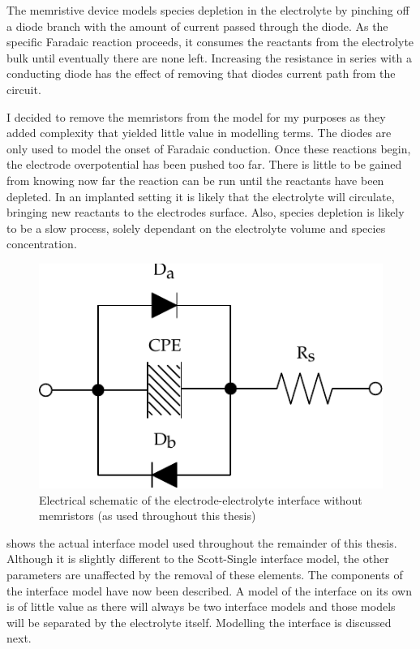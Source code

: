       The memristive device models species depletion in the electrolyte by pinching off a diode branch with the amount of current passed through the diode.
      As the specific Faradaic reaction proceeds, it consumes the reactants from the electrolyte bulk until eventually there are none left.
      Increasing the resistance in series with a conducting diode has the effect of removing that diodes current path from the circuit.

      I decided to remove the memristors from the model for my purposes as they added complexity that yielded little value in modelling terms.
      The diodes are only used to model the onset of Faradaic conduction.
      Once these reactions begin, the electrode overpotential has been pushed too far.
      There is little to be gained from knowing now far the reaction can be run until the reactants have been depleted.
      In an implanted setting it is likely that the electrolyte will circulate, bringing new reactants to the electrodes surface.
      Also, species depletion is likely to be a slow process, solely dependant on the electrolyte volume and species concentration.

      \begin{figure}
        \centering
        \includegraphics{content/pt2/07-InterfaceModel/graphics/interfaceSchematic_noMemristive}
        \caption{\label{fig:pt2-interfaceSchematic_noMemristive}Electrical schematic of the electrode-electrolyte interface without memristors (as used throughout this thesis)}
      \end{figure}

       shows the actual interface model used throughout the remainder of this thesis.
      Although it is slightly different to the Scott-Single interface model, the other parameters are unaffected by the removal of these elements.
      The components of the interface model have now been described.
      A model of the interface on its own is of little value as there will always be two interface models and those models will be separated by the electrolyte itself.
      Modelling the interface is discussed next.


